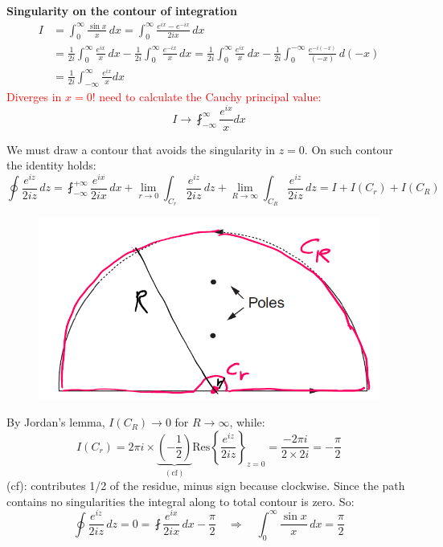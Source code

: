 \documentclass{article}
\begin{document}
\vspace{2mm}\noindent
\textbf{Singularity on the contour of integration}
\begin{align*}
    I &= \int_0^\infty \frac{\sin x}{x} \, dx
= \int_0^\infty \frac{e^{ix} - e^{-ix}}{2i x} \, dx\\
&= \frac{1}{2i} \int_0^\infty \frac{e^{ix}}{x} \, dx
- \frac{1}{2i} \int_0^\infty \frac{e^{-ix}}{x} \, dx
= \frac{1}{2i} \int_0^\infty \frac{e^{ix}}{x} \, dx
- \frac{1}{2i} \int_0^{-\infty} \frac{e^{-i(-x)}}{(-x)} \, d(-x)\\
&= \frac{1}{2i} \int_{-\infty}^{\infty} \frac{e^{ix}}{x}dx
\end{align*}
\textcolor{red}{Diverges in $x=0$! need to calculate the Cauchy principal value:}
\begin{equation}
    I \rightarrow \fint_{-\infty}^{\infty} \frac{e^{ix}}{x}dx
\end{equation}

\newpage
\noindent
We must draw a contour that avoids the singularity in $z=0$. On such contour the identity holds:
\begin{equation}
    \oint \frac{e^{iz}}{2i z} \, dz
= \fint_{-\infty}^{+\infty} \frac{e^{ix}}{2i x} \, dx
+ \lim_{r \to 0} \int_{C_r} \frac{e^{iz}}{2i z} \, dz
+ \lim_{R \to \infty} \int_{C_R} \frac{e^{iz}}{2i z} \, dz
= I + I(C_r) + I(C_R)
\end{equation}

\begin{figure}[h]
    \centering
    \includegraphics[width=0.5\linewidth]{fig39.png}
\end{figure}

\noindent
By Jordan’s lemma, $I(C_R) \rightarrow 0$ for $R \rightarrow \infty$, while:
\begin{equation}
    I(C_r) = 2\pi i \times \underbrace{\left( -\frac12 \right)}_{(\text{cf})} \text{Res} \left\{ \frac{e^{iz}}{2iz} \right\}_{z=0} = \frac{-2\pi i }{2 \times 2i} = -\frac{\pi}{2}
\end{equation} 
(cf): contributes 1/2 of the residue, minus sign because clockwise. Since the path contains no singularities the integral along to total contour is zero. So:
\begin{equation}
    \oint \frac{e^{iz}}{2i z} \, dz = 0 
= \fint \frac{e^{ix}}{2i x} \, dx 
- \frac{\pi}{2}
\quad \Rightarrow \quad 
\int_0^{\infty} \frac{\sin x}{x} \, dx = \frac{\pi}{2}
\end{equation}
\end{document}
